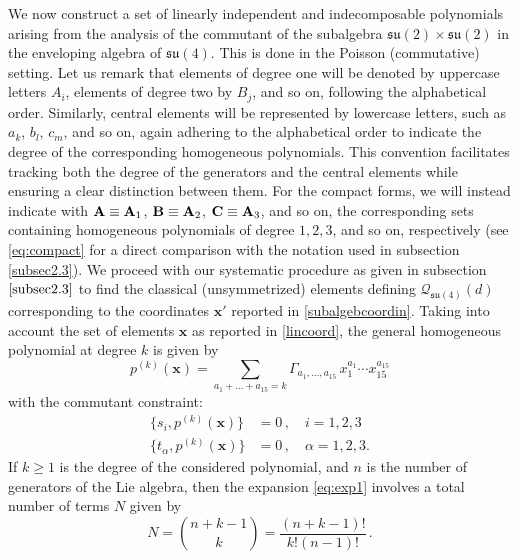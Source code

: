 \documentclass[10pt]{amsart}
\theoremstyle{definition}
\theoremstyle{corollary}
\theoremstyle{remark}
\theoremstyle{conclusion}
\begin{document}
We now construct a set of linearly independent and indecomposable polynomials arising from the analysis of the commutant of the subalgebra $\mathfrak{su}(2) \times \mathfrak{su}(2)$ in the enveloping algebra of $\mathfrak{su}(4)$. This is done in the Poisson (commutative) setting. Let us remark that elements of degree one will be denoted by uppercase letters $A_i$, elements of degree two by $B_j$, and so on, following the alphabetical order. Similarly, central elements will be represented by lowercase letters, such as $a_k$, $b_l$, $c_m$, and so on, again adhering to the alphabetical order to indicate the degree of the corresponding homogeneous polynomials. This convention facilitates tracking both the degree of the generators and the central elements while ensuring a clear distinction between them. For the compact forms, we will instead indicate with ${\bf A} \equiv  {\bf A}_1$, ${\bf B} \equiv  {\bf A}_2$,   ${\bf C} \equiv  {\bf A}_3$, and so on, the corresponding sets containing homogeneous polynomials of degree $1, 2, 3$, and so on, respectively (see \eqref{eq:compact} for a direct comparison with the notation used in subsection \ref{subsec2.3}). We proceed with our systematic procedure as given in subsection $\ref{subsec2.3}$ to find the classical (unsymmetrized) elements defining $\mathcal{Q}_{\mathfrak{su}(4) }(d)$ corresponding to the coordinates $\boldsymbol{x}'$  reported in \eqref{subalgebcoordin}.
Taking into account the set of elements $\boldsymbol{x}$ as reported in \eqref{lincoord}, the general homogeneous polynomial at degree $k$ is given by 
\begin{equation}
p^{(k)}(\boldsymbol{x})=\sum_{a_1+\ldots + a_{15}= {k}} \Gamma_{a_1, \dots, a_{15}} \,x_1^{a_1} \cdots x_{15}^{a_{15}}  
\label{eq:exp1}
\end{equation}
with the commutant constraint:
\begin{equation}
\begin{split}
\{s_i, p^{(k)}(\boldsymbol{x})\}&=0 \, , \quad i=1,2,3 \\
 \{t_\alpha, p^{(k)}(\boldsymbol{x})\}&=0  \, ,\quad \alpha=1,2,3.
\label{pdes}
\end{split}
\end{equation}
If $ k \geq 1$ is the degree of the considered  polynomial, and $ n$ is the number of generators of the Lie algebra, then the expansion \eqref{eq:exp1} involves a total number of terms $N$ given by
\begin{equation}
N=\binom{ n+k-1}{k}=\frac{( n+k-1)!}{k!( n-1)!} \, .
\end{equation}
\end{document}
